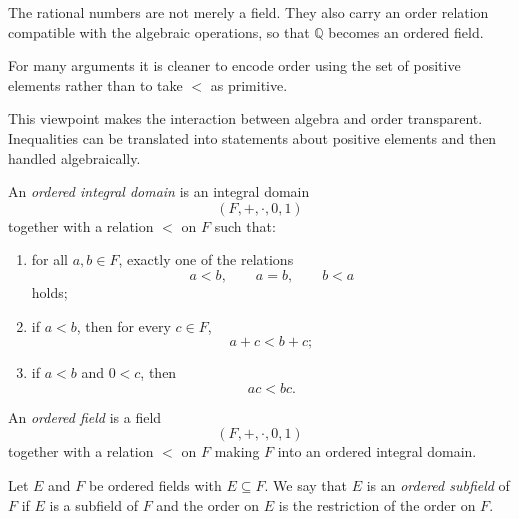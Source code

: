 
\label{sec:defining-order-on-q}

\begin{exposition}
The rational numbers are not merely a field. They also carry an order
relation compatible with the algebraic operations, so that $\mathbb{Q}$
becomes an ordered field.
\end{exposition}

\begin{remark*}
For many arguments it is cleaner to encode order using the set of
positive elements rather than to take $<$ as primitive.
\end{remark*}


\begin{remark*}
This viewpoint makes the interaction between algebra and order
transparent. Inequalities can be translated into statements about
positive elements and then handled algebraically.
\end{remark*}

\begin{definition}
\label{def:ordered-integral-domain}
An \emph{ordered integral domain} is an integral domain
\[
(F,+,\cdot,0,1)
\]
together with a relation $<$ on $F$ such that:
\begin{enumerate}
  \item for all $a,b\in F$, exactly one of the relations
  \[
  a<b,\qquad a=b,\qquad b<a
  \]
  holds;
  \item if $a<b$, then for every $c\in F$,
  \[
  a+c<b+c;
  \]
  \item if $a<b$ and $0<c$, then
  \[
  ac<bc.
  \]
\end{enumerate}
\end{definition}

\begin{definition}
\label{def:rational-ordered-field}
An \emph{ordered field} is a field
\[
(F,+,\cdot,0,1)
\]
together with a relation $<$ on $F$ making $F$ into an ordered integral
domain.
\end{definition}

\begin{definition}
\label{def:ordered-subfield}
Let $E$ and $F$ be ordered fields with $E\subseteq F$. We say that $E$ is an
\emph{ordered subfield} of $F$ if $E$ is a subfield of $F$ and the order on
$E$ is the restriction of the order on $F$.
\end{definition}

